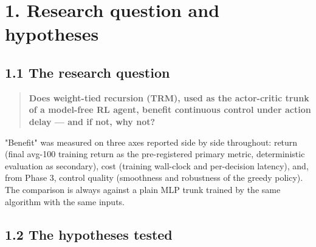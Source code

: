 \documentclass[11pt]{article}
\begin{document}
\medskip



\section*{1. Research question and hypotheses}



\subsection*{1.1 The research question}



\begin{quote}\textbf{Does weight-tied recursion (TRM), used as the actor-critic trunk of a model-free RL agent, benefit continuous control under action delay --- and if not, why not?}\end{quote}



"Benefit" was measured on three axes reported side by side throughout: return (final avg-100 training return as the pre-registered primary metric, deterministic evaluation as secondary), cost (training wall-clock and per-decision latency), and, from Phase 3, control quality (smoothness and robustness of the greedy policy). The comparison is always against a plain MLP trunk trained by the same algorithm with the same inputs.



\subsection*{1.2 The hypotheses tested}
\end{document}
